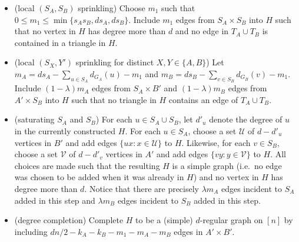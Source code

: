 \documentclass[11pt]{article}
\newcommand{\jc}[1]{{\color{blue}[Jane: #1]}}
\newcommand{\overbar}[1]{\mkern 1.5mu\overline{\mkern-1.5mu#1\mkern-1.5mu}\mkern 1.5mu}
\theoremstyle{plain}
\begin{document}
    \begin{itemize}
        \item[1.](local $(S_A, S_B)$ sprinkling) Choose $m_1$ such that $0 \leq m_1 \leq \min\{s_As_B, ds_A,ds_B\}$.
 Include $m_1$ edges from $S_A \times S_B$ into $H$ such that no vertex in $H$ has degree more than $d$ and no edge in $T_A \cup T_B$ is contained in a triangle in $H$.
        \item[2.](local $(S_X, Y')$ sprinkling for distinct $X,Y \in \{A,B\}$) Let $m_A = ds_A  - \sum_{u \in S_A}d_{G_A}(u) - m_1$ and $m_B= ds_B -  \sum_{v \in S_B}d_{G_B}(v)- m_1$.  Include $(1 - \lambda )m_A$ edges from $S_A \times B'$ and $(1 - \lambda )m_B$ edges from $A' \times S_B$ into $H$ such that no triangle in $H$ contains an edge of $T_A \cup T_B$.
        \item[3.](saturating $S_A$ and $S_B$) For each $u \in S_A \cup S_B$, let $d'_u$ denote the degree of $u$ in the currently constructed $H$. For each $u \in S_A$, choose a set $\mathcal{U}$ of $d - d'_u$ vertices in $B'$ and add edges $\{ux: x\in{\mathcal U}\}$ to $H$.  Likewise, for each $v \in S_B$, choose a set $\mathcal{V}$ of $d - d'_v$ vertices in $A'$ and add edges $\{vy: y\in{\mathcal V}\}$ to $H$. All choices are made such that the resulting $H$ is a simple graph (i.e.\ no edge was chosen to be added when it was already in $H$) and no vertex in $H$ has degree more than $d$. Notice that there are precisely $\lambda  m_A$ edges incident to $S_A$ added in this step and $\lambda  m_B$ edges incident to $S_B$ added in this step.
        \item[4.](degree completion) Complete $H$ to be a (simple) $d$-regular graph on $[n]$ by including $dn/2 - k_A - k_B - m_1 - m_A - m_B$ edges in $A'\times B'$.
    \end{itemize}
\end{document}
